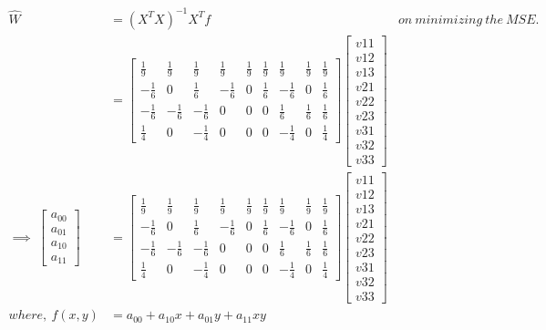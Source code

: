 \documentclass[a4paper,fleqn,11pt]{article}
\theoremstyle{mytheor}
\begin{document}
\begin{align}
\hat{W} & = (X^TX)^{-1}X^Tf & on\ minimizing\ the\ MSE. \\
& = \begin{bmatrix}
\frac{1}{9} & \frac{1}{9} & \frac{1}{9} & \frac{1}{9} & \frac{1}{9} & \frac{1}{9} & \frac{1}{9} & \frac{1}{9} & \frac{1}{9} \\
-\frac{1}{6} & 0 & \frac{1}{6} & -\frac{1}{6} & 0 & \frac{1}{6} & -\frac{1}{6} &  0 & \frac{1}{6} \\
-\frac{1}{6} & -\frac{1}{6} & -\frac{1}{6} & 0 & 0 & 0 & \frac{1}{6} & \frac{1}{6} & \frac{1}{6} \\
\frac{1}{4} & 0 & -\frac{1}{4} & 0 & 0 & 0 & -\frac{1}{4} & 0 & \frac{1}{4}
\end{bmatrix}
\begin{bmatrix}
	v{11} \\
	v{12} \\
	v{13} \\
	v{21} \\
	v{22} \\
	v{23} \\
	v{31} \\
	v{32} \\
	v{33}
\end{bmatrix} \\
\implies\ 
\begin{bmatrix}
	a_{00} \\
	a_{01} \\
	a_{10} \\
	a_{11}	
\end{bmatrix} & =
\begin{bmatrix}
\frac{1}{9} & \frac{1}{9} & \frac{1}{9} & \frac{1}{9} & \frac{1}{9} & \frac{1}{9} & \frac{1}{9} & \frac{1}{9} & \frac{1}{9} \\
-\frac{1}{6} & 0 & \frac{1}{6} & -\frac{1}{6} & 0 & \frac{1}{6} & -\frac{1}{6} &  0 & \frac{1}{6} \\
-\frac{1}{6} & -\frac{1}{6} & -\frac{1}{6} & 0 & 0 & 0 & \frac{1}{6} & \frac{1}{6} & \frac{1}{6} \\
\frac{1}{4} & 0 & -\frac{1}{4} & 0 & 0 & 0 & -\frac{1}{4} & 0 & \frac{1}{4}
\end{bmatrix}
\begin{bmatrix}
	v{11} \\
	v{12} \\
	v{13} \\
	v{21} \\
	v{22} \\
	v{23} \\
	v{31} \\
	v{32} \\
	v{33}
\end{bmatrix} \\
where,\ f(x, y) & = a_{00} + a_{10}x + a_{01}y + a_{11}xy
\end{align}
\end{document}
